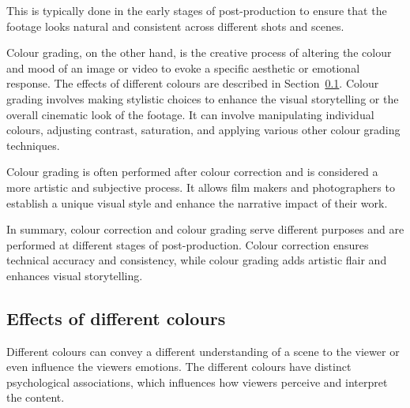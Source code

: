 \documentclass[../MasterThesis.tex]{subfiles}
\begin{document}
This is typically done in the early stages of post-production to ensure that the footage looks natural and consistent across different shots and scenes.~\cite{cc1}


Colour grading, on the other hand, is the creative process of altering the colour and mood of an image or video to evoke a specific aesthetic or emotional response. The effects of different colours are described in Section~\ref{subsection:effectsofdifferentcolours}.
Colour grading involves making stylistic choices to enhance the visual storytelling or the overall cinematic look of the footage. It can involve manipulating individual colours, adjusting contrast, saturation, and applying various other colour grading techniques.~\cite{cc_cg_1, cc_cg_2}

Colour grading is often performed after colour correction and is considered a more artistic and subjective process. It allows film makers and photographers to establish a unique visual style and enhance the narrative impact of their work.~\cite{cc_cg_1, cc_cg_2}


In summary, colour correction and colour grading serve different purposes and are performed at different stages of post-production. Colour correction ensures technical accuracy and consistency, while colour grading adds artistic flair and enhances visual storytelling.~\cite{cc1, cc_cg_1, cc_cg_2}


















\newpage
\subsection{Effects of different colours} 
\label{subsection:effectsofdifferentcolours}

Different colours can convey a different understanding of a scene to the viewer or even influence the viewers emotions. 
The different colours have distinct psychological associations, which influences how viewers perceive and interpret the content.~\cite{colour, colour2}
\end{document}
